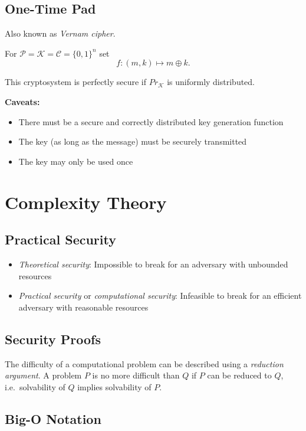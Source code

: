 \documentclass[a4paper]{scrartcl}
\newcommand\cP{\mathcal P}
\newcommand\cC{\mathcal C}
\newcommand\cK{\mathcal K}
\newcommand\Prob{\mathit{Pr}}
\begin{document}
\subsection{One-Time Pad}

Also known as \textit{Vernam cipher}.

For $\cP=\cK=\cC = \{0,1\}^n$ set \[f:(m,k)\mapsto m\oplus k.\]

This cryptosystem is perfectly secure if $\Prob_\cK$ is uniformly distributed.

\textbf{Caveats:}\begin{itemize}
    \item There must be a secure and correctly distributed key generation function
    \item The key (as long as the message) must be securely transmitted
    \item The key may only be used once
\end{itemize}

\section{Complexity Theory}
\subsection{Practical Security}

\begin{itemize}
    \item \textit{Theoretical security}: Impossible to break for an adversary with
        unbounded resources
    \item \textit{Practical security} or \textit{computational security}: Infeasible
        to break for an efficient adversary with reasonable resources
\end{itemize}

\subsection{Security Proofs}

The difficulty of a computational problem can be described using a \textit{reduction
argument}. A problem $P$ is no more difficult than $Q$ if $P$ can be reduced to $Q$,
i.e.\ solvability of $Q$ implies solvability of $P$.

\subsection{Big-O Notation}
\end{document}
